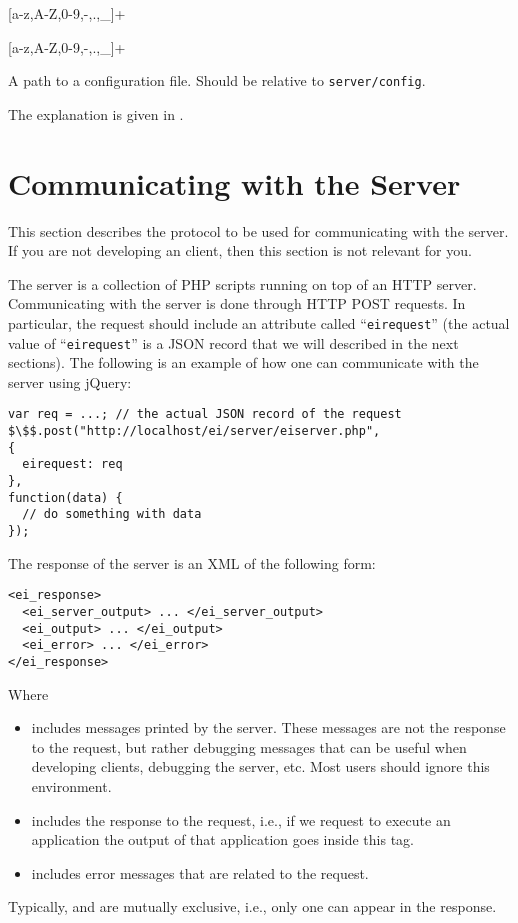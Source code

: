 [a-z,A-Z,0-9,-,.,\_]+

\bigskip
\noindent
{}

[a-z,A-Z,0-9,-,.,\_]+

\bigskip
\noindent
{}

A path to a configuration file. Should be relative to
\texttt{server/config}.

\bigskip
\noindent
{}

The explanation is given in .

\section{Communicating with the \ei Server}
\label{ch:server:protocol}

This section describes the protocol to be used for communicating with
the \ei server. If you are not developing an \ei client, then this
section is not relevant for you.

The \ei server is a collection of PHP scripts running on top of an
HTTP server. Communicating with the server is done through HTTP POST
requests. 
%
In particular, the request should include an attribute called
``\texttt{eirequest}'' (the actual value of ``\texttt{eirequest}'' is
a JSON record that we will described in the next sections). The
following is an example of how one can communicate with the server
using jQuery:

\bigskip
\begin{lstlisting}
var req = ...; // the actual JSON record of the request
$\$$.post("http://localhost/ei/server/eiserver.php",
{
  eirequest: req
},
function(data) { 
  // do something with data
});
\end{lstlisting}

\bigskip
\noindent
The response of the server is an XML of the following form:

\bigskip
\begin{lstlisting}
<ei_response>
  <ei_server_output> ... </ei_server_output>
  <ei_output> ... </ei_output>
  <ei_error> ... </ei_error>
</ei_response>
\end{lstlisting}

\bigskip
\noindent
Where
%
\begin{itemize}
%
\item {} includes messages printed by the
  server. These messages are not the response to the request, but
  rather debugging messages that can be useful when developing
  clients, debugging the server, etc. Most users should ignore this
  environment.
%
\item {} includes the response to the request, i.e., if
  we request to execute an application the output of that application
  goes inside this tag.
%
\item {} includes error messages that are related to the
  request.
%
\end{itemize}
%
Typically,  and  are mutually exclusive,
i.e., only one can appear in the response. 


